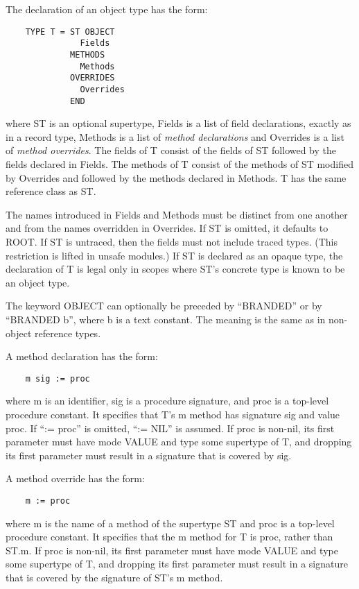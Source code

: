 \documentclass[10pt]{article}
\begin{document}
The declaration of an object type has the form:
\begin{verbatim}
    TYPE T = ST OBJECT
               Fields
             METHODS
               Methods
             OVERRIDES
               Overrides
             END
\end{verbatim}
where ST is an optional supertype, Fields is a list of field declarations,
exactly as in a record type, Methods is a list of \emph{method declarations}
and Overrides is a list of \emph{method overrides}.  The fields of T consist
of the fields of ST followed by the fields declared in Fields.  The methods of
T consist of the methods of ST modified by Overrides and followed by the
methods declared in Methods.  T has the same reference class as ST.

The names introduced in Fields and Methods must be distinct from one another
and from the names overridden in Overrides.  If ST is omitted, it defaults to
ROOT.  If ST is untraced, then the fields must not include traced types.
(This restriction is lifted in unsafe modules.) If ST is declared as an opaque
type, the declaration of T is legal only in scopes where ST's concrete type is
known to be an object type.

The keyword OBJECT can optionally be preceded by ``BRANDED'' or by ``BRANDED
b'', where b is a text constant.  The meaning is the same as in non-object
reference types.

A method declaration has the form:
\begin{verbatim}
    m sig := proc
\end{verbatim}
where m is an identifier, sig is a procedure signature, and proc is a
top-level procedure constant.  It specifies that T's m method has signature
sig and value proc.  If ``:= proc'' is omitted, ``:= NIL'' is assumed.  If
proc is non-nil, its first parameter must have mode VALUE and type some
supertype of T, and dropping its first parameter must result in a signature
that is covered by sig.

A method override has the form:
\begin{verbatim}
    m := proc
\end{verbatim}
where m is the name of a method of the supertype ST and proc is a top-level
procedure constant.  It specifies that the m method for T is proc, rather than
ST.m.  If proc is non-nil, its first parameter must have mode VALUE and type
some supertype of T, and dropping its first parameter must result in a
signature that is covered by the signature of ST's m method.
\end{document}
